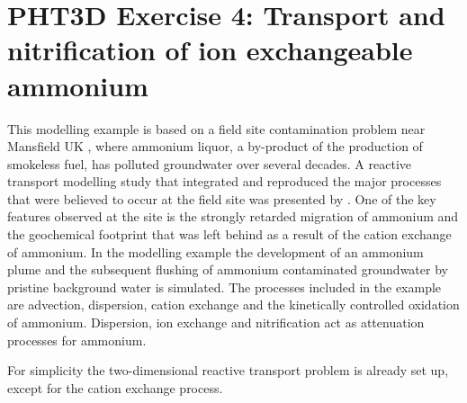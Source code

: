 \section[PHT3D Exercise 4: Transport and nitrification of ion exchangeable ammonium]{PHT3D Exercise 4: Transport and nitrification of ion exchangeable ammonium}

This modelling example is based on a field site contamination problem near
Mansfield UK \citep[see, e.g.,][]{broholm98, phddavison,jones1998, davison2000,
jones2001}, where ammonium liquor, a by-product of the production
of smokeless fuel, has polluted groundwater over several decades.
A reactive transport modelling study that integrated 
and reproduced the major processes that were believed to occur at the
field site was presented by \cite{haerens_phd}. 
One of the key features observed at the site is the
strongly retarded migration of ammonium and the geochemical footprint that
was left behind as a result of the cation exchange of ammonium.  
In the modelling example the development of an ammonium plume
and the subsequent flushing of ammonium contaminated groundwater by
pristine background water is simulated.  The processes included in
the example are advection, dispersion, cation exchange
and the kinetically controlled oxidation of ammonium.
Dispersion, ion exchange and nitrification act as attenuation 
processes for ammonium.

For simplicity the two-dimensional reactive transport problem is already set up, except for the 
cation exchange process. 



